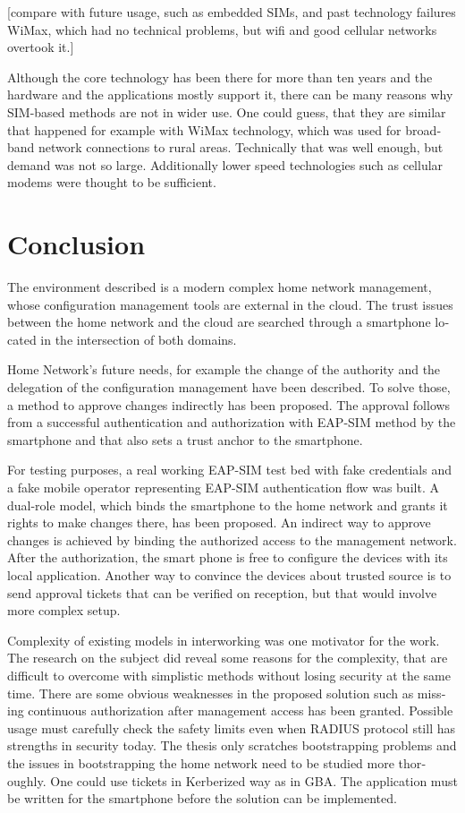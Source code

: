 \documentclass[12pt,a4paper,english]{tutthesis}
\begin{document}
\begin{otherlanguage}{english}
[compare with future usage, such as embedded SIMs, and past technology 
failures WiMax, which had no technical problems, but wifi and good
cellular networks overtook it.]

Although the core technology has been there for more than ten years and
the hardware and the applications mostly support it, 
there can be many reasons why SIM-based methods are not in wider use. 
One could guess, that they are similar that happened for example with 
WiMax technology, which was used for broadband network connections to
rural areas. Technically that was well enough, but demand was not so
large. Additionally lower speed technologies such as cellular modems
were thought to be sufficient.


\chapter{Conclusion}
\label{sec-7}



The environment described is a modern complex home network management, whose configuration
management tools are external in the cloud. The trust issues between the
home network and the cloud are searched through a 
smartphone located in the intersection of both domains.

Home Network's future needs, for example  the change of the authority and the
delegation of the configuration management have been described. 
To solve those, a method to approve changes indirectly has been proposed. The approval
follows from a successful authentication and authorization with EAP-SIM
method by the smartphone and that also sets a trust anchor to the smartphone.


For testing purposes, a real working EAP-SIM test bed with fake credentials and
a fake mobile operator representing EAP-SIM authentication flow was
built. A dual-role model, which binds the smartphone to the home network and
grants it rights to make changes there, has been proposed.  
An indirect way to approve changes is achieved by binding the authorized
access to the management network. After the authorization, the smart
phone is free to configure the devices with its local application.
Another way to convince the
devices about trusted source is to send approval tickets that can
be verified on reception, but that would involve more complex setup.

Complexity of existing models in interworking was one motivator for
the work. The research  on the subject did reveal some reasons 
for the complexity, that are difficult to overcome with simplistic 
methods without losing security at the same time.
There are some obvious weaknesses in the proposed solution such as 
missing continuous authorization after management access has been granted.
 Possible usage must carefully check the safety limits even when RADIUS protocol still
has strengths in security today. The thesis only scratches bootstrapping
problems and the issues in bootstrapping the home network need to be studied
more thoroughly. One could use tickets in Kerberized way as in GBA.
The application must be written for the smartphone before the solution
can be implemented.


\end{otherlanguage}
\end{document}
